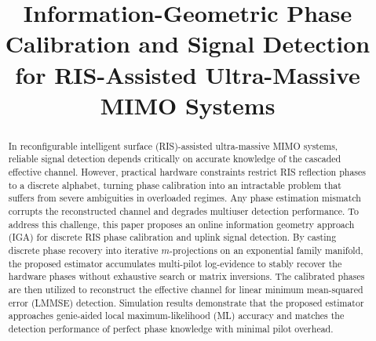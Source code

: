 \documentclass[conference]{IEEEtran}
\begin{document}
	
	\title{Information-Geometric Phase Calibration and Signal Detection for RIS-Assisted Ultra-Massive MIMO Systems}
	
	\author{
		\and
		\and
	}
	
	\maketitle
	
\begin{abstract}
	In reconfigurable intelligent surface (RIS)-assisted ultra-massive MIMO systems, reliable signal detection depends critically on accurate knowledge of the cascaded effective channel. However, practical hardware constraints restrict RIS reflection phases to a discrete alphabet, turning phase calibration into an intractable problem that suffers from severe ambiguities in overloaded regimes. Any phase estimation mismatch corrupts the reconstructed channel and degrades multiuser detection performance. To address this challenge, this paper proposes an online information geometry approach (IGA) for discrete RIS phase calibration and uplink signal detection. By casting discrete phase recovery into iterative $m$-projections on an exponential family manifold, the proposed estimator accumulates multi-pilot log-evidence to stably recover the hardware phases without exhaustive search or matrix inversions. The calibrated phases are then utilized to reconstruct the effective channel for linear minimum mean-squared error (LMMSE) detection. Simulation results demonstrate that the proposed estimator approaches genie-aided local maximum-likelihood (ML) accuracy and matches the detection performance of perfect phase knowledge with minimal pilot overhead.
\end{abstract}
\end{document}
